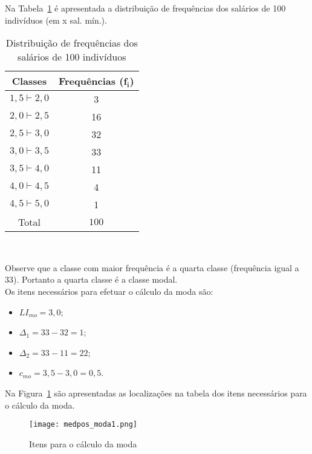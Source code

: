\documentclass[11pt,fleqn]{book} %
\begin{document}
\begin{example}

Na Tabela~\ref{tab:distdadoscontinuos2} é apresentada a distribuição de frequências dos salários de 100 indivíduos (em x sal. mín.). \\

\begin{table}[h]
	\caption{Distribuição de frequências dos salários de 100 indivíduos}
	\label{tab:distdadoscontinuos2} 
	\vspace{-0.1cm}
	\centering
	\begin{tabular}{c c}
	\toprule
	\textbf{Classes} & \textbf{Frequências} ($\bm{f_i}$) \\
	\midrule
	$1,5 \vdash 2,0$ & 3 \\
	$2,0 \vdash 2,5$ & 16 \\
	$2,5 \vdash 3,0$ & 32 \\
	$3,0 \vdash 3,5$ & 33 \\
	$3,5 \vdash 4,0$ & 11 \\
	$4,0 \vdash 4,5$ & 4 \\
	$4,5 \vdash 5,0$ & 1 \\
	\hline
	Total & $100$ \\
	\bottomrule
	\end{tabular} \\
\end{table}


\vspace {2cm}
	
Observe que a classe com maior frequência é a quarta classe (frequência igual a 33). Portanto a quarta classe é a classe modal. \\



Os itens necessários para efetuar o cálculo da moda são:

\begin{itemize}
\item $LI_{mo}=3,0$;
\item $\Delta_1=33-32=1$;
\item $\Delta_2=33-11=22$;
\item $c_{mo}=3,5-3,0=0,5$. \\
\end{itemize}

Na Figura~\ref{fig:medpos_moda1} são apresentadas as localizações na tabela dos itens necessários para o cálculo da moda.

\begin{figure}[h]
\centering\texttt{[image: medpos\_moda1.png]}
\caption{Itens para o cálculo da moda}
\label{fig:medpos_moda1} %
\end{figure}


\end{example}
\end{document}
